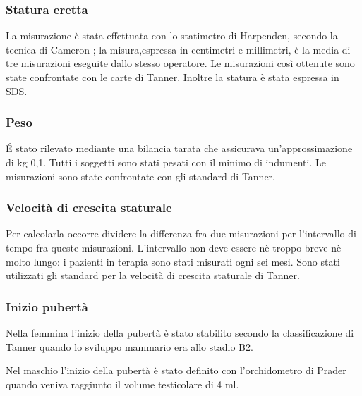 \subsubsection*{Statura eretta}
 La misurazione è stata effettuata con lo statimetro di Harpenden, secondo la tecnica di Cameron\cite{cameron1984measurement}
; la misura,espressa in centimetri e millimetri, è la media di tre misurazioni eseguite dallo stesso operatore. Le misurazioni così ottenute sono state confrontate con le carte di Tanner\cite{tanner1966standards}.
Inoltre la statura è stata espressa in SDS.

  
\subsubsection*{Peso}
 \'E stato rilevato mediante una bilancia tarata che assicurava un'approssimazione di kg 0,1. Tutti i soggetti sono stati pesati con il minimo di indumenti. Le misurazioni sono state confrontate con gli standard di Tanner\cite{tanner1966standards}. 

\subsubsection*{Velocità di crescita staturale}
Per calcolarla occorre dividere la differenza fra due misurazioni per l'intervallo di tempo fra queste misurazioni. L'intervallo non deve essere nè troppo breve nè molto lungo: i pazienti in terapia sono stati misurati ogni sei mesi. Sono stati utilizzati gli standard per la velocità di crescita staturale di Tanner\cite{tanner1966standards}.

\subsubsection*{Inizio pubertà}
Nella femmina l'inizio della pubertà è stato stabilito secondo la classificazione di Tanner\cite{tanner1990foetus} quando lo sviluppo mammario era allo stadio B2.

Nel maschio l'inizio della pubertà è stato definito con l'orchidometro di Prader quando veniva raggiunto il volume testicolare di 4 ml.



